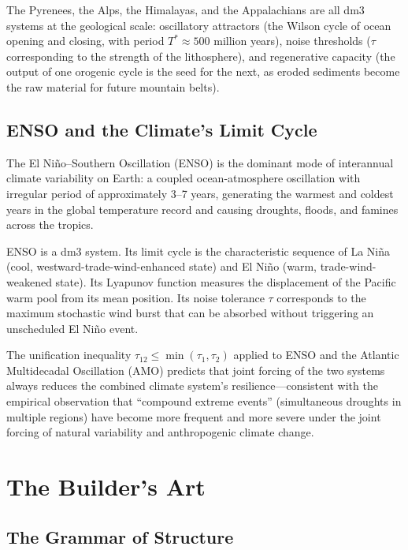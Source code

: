 \documentclass[12pt, oneside]{book}
\theoremstyle{plain}
\theoremstyle{definition}
\theoremstyle{remark}
\begin{document}
The Pyrenees, the Alps, the Himalayas, and the Appalachians
are all dm3 systems at the geological scale: oscillatory
attractors (the Wilson cycle of ocean opening and closing,
with period $T^* \approx 500$ million years), noise thresholds
($\tau$ corresponding to the strength of the lithosphere),
and regenerative capacity (the output of one orogenic cycle
is the seed for the next, as eroded sediments become the raw
material for future mountain belts).

\section{ENSO and the Climate's Limit Cycle}

The El Niño--Southern Oscillation (ENSO) is the dominant mode
of interannual climate variability on Earth: a coupled
ocean-atmosphere oscillation with irregular period of
approximately 3--7 years, generating the warmest and coldest
years in the global temperature record and causing droughts,
floods, and famines across the tropics.

ENSO is a dm3 system. Its limit cycle is the characteristic
sequence of La Niña (cool, westward-trade-wind-enhanced
state) and El Niño (warm, trade-wind-weakened state). Its
Lyapunov function measures the displacement of the Pacific
warm pool from its mean position. Its noise tolerance $\tau$
corresponds to the maximum stochastic wind burst that can
be absorbed without triggering an unscheduled El Niño event.

The unification inequality $\tau_{12} \leq \min(\tau_1, \tau_2)$
applied to ENSO and the Atlantic Multidecadal Oscillation (AMO)
predicts that joint forcing of the two systems always reduces
the combined climate system's resilience---consistent with
the empirical observation that ``compound extreme events''
(simultaneous droughts in multiple regions) have become more
frequent and more severe under the joint forcing of natural
variability and anthropogenic climate change.

\chapter{The Builder's Art}
\label{ch:builder}

\section{The Grammar of Structure}
\end{document}
